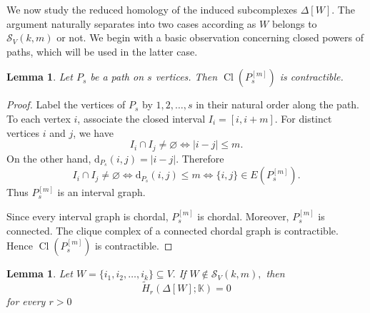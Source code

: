 \documentclass[12pt,reqno]{amsart}
\newtheorem{lemma}[theorem]{Lemma}
\theoremstyle{definition}
\numberwithin{equation}{section}
\def\K{\mathbb{K}}
\begin{document}
We now study the reduced homology of the induced subcomplexes
$\Delta[W]$. The argument naturally separates into two cases according
as $W$ belongs to $\mathcal{S}_V(k,m)$ or not. We begin with a basic
observation concerning closed powers of paths, which will be used in
the latter case.


\begin{lemma}\label{lem:pathpower}
	Let $P_s$ be a path on $s$ vertices. Then
	\( \operatorname{Cl}(P_s^{[m]}) \)
	is contractible.
\end{lemma}

\begin{proof}
	Label the vertices of $P_s$ by \( 1,2,\ldots,s \)
	in their natural order along the path. To each vertex $i$, associate the closed interval \( I_i=[i,i+m]. \)	For distinct vertices $i$ and $j$, we have
	\[
	I_i\cap I_j\neq\varnothing
	\Longleftrightarrow
	|i-j|\leq m.
	\]
	On the other hand, \( \mathrm{d}_{P_s}(i,j)=|i-j|. \)
	Therefore
	\[
	I_i\cap I_j\neq\varnothing
	\Longleftrightarrow
	\mathrm{d}_{P_s}(i,j)\leq m
	\Longleftrightarrow
	\{i,j\}\in E(P_s^{[m]}).
	\]
	Thus $P_s^{[m]}$ is an interval graph.
	
	Since every interval graph is chordal, $P_s^{[m]}$ is chordal. Moreover,
	$P_s^{[m]}$ is connected. The clique complex of a connected chordal
	graph is contractible. Hence \( \operatorname{Cl}(P_s^{[m]}) \)
	is contractible.
\end{proof}

\begin{lemma}\label{lem:contractible}
	Let \( W=\{i_1,i_2,\ldots,i_k\}\subseteq V. \)
	If \( W\notin\mathcal{S}_V(k,m), \)
	then
	\[
	\widetilde H_r(\Delta[W];\K)=0
	\]
	for every  \( r>0 \)
\end{lemma}
\end{document}
